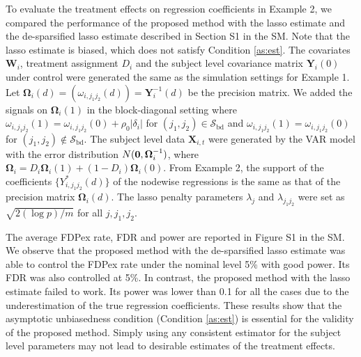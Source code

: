 \documentclass[12pt]{article}
\theoremstyle{definition}
\newcommand{\bW}{{\mathbf W}}
\newcommand{\bX}{{\mathbf X}}
\newcommand{\bY}{{\mathbf Y}}
\newcommand{\bOmega}{\boldsymbol{\Omega}}
\begin{document}
To evaluate the treatment effects on regression coefficients in Example 2, 
we compared the performance of the proposed method with the lasso estimate and the de-sparsified lasso estimate described in Section S1 in the SM.
Note that the lasso estimate is biased, which does not satisfy Condition \ref{as:est}. 
The covariates $\bW_i$, treatment assignment $D_i$ and the subject level covariance matrix $\bY_i(0)$ under control were generated the same as the simulation settings for Example 1. Let $\bOmega_{i}(d) = (\omega_{i, j_1j_2}(d)) = \bY_i^{-1}(d)$ be the precision matrix. 
We added the signals on $\bOmega_{i}(1)$ in the block-diagonal setting where 
$\omega_{i, j_1j_2}(1) = \omega_{i, j_1j_2}(0) + \rho_{0}|\delta_{i}| $ for $(j_1, j_2) \in \mathcal{S}_{\mathrm{\scriptstyle bd}}$ and $\omega_{i, j_1j_2}(1) = \omega_{i, j_1j_2}(0)$ for $(j_1, j_2) \not\in \mathcal{S}_{\mathrm{\scriptstyle bd}}$.
The subject level data $\bX_{i, t}$ were generated by the VAR model with the error distribution $N({\bf 0}, \bOmega_{i}^{-1})$, where $\bOmega_{i} = D_{i}\bOmega_{i}(1) + (1 - D_{i}) \bOmega_{i}(0)$.
From Example 2, the support of the coefficients $\{Y^{\ast}_{i, j_1j_2}(d)\}$ of the nodewise regressions is the same as that of the precision matrix $\bOmega_{i}(d)$.
The lasso penalty parameters $\lambda_{j}$ and $\lambda_{j_1j_2}$ were set as $\sqrt{2(\log p) / m}$ for all $j, j_1, j_2$.

The average FDPex rate, FDR and power are reported in Figure S1 in the SM. We observe that the proposed method with the de-sparsified lasso estimate was able to control the FDPex rate under the nominal level 5\% with good power. Its FDR was also controlled at 5\%.
In contrast, the proposed method with the lasso estimate failed to work. Its power was lower than 0.1 for all the cases due to the underestimation of the true regression coefficients. 
These results show that the asymptotic unbiasedness condition (Condition \ref{as:est}) is essential for the validity of the proposed method. Simply using any consistent estimator for the subject level parameters 
may not lead to desirable estimates of the treatment effects.

\end{document}
